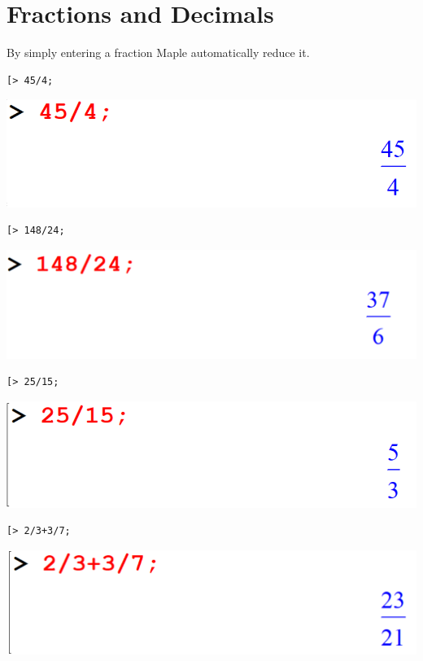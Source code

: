 \documentclass[
]{book}
\theoremstyle{definition}
\theoremstyle{definition}
\theoremstyle{definition}
\theoremstyle{definition}
\theoremstyle{remark}
\begin{document}
\section{Fractions and Decimals}\label{fractions-and-decimals}

By simply entering a fraction Maple automatically reduce it.

\begin{verbatim}
[> 45/4;
\end{verbatim}

\includegraphics{figures/Lesson 1/fig19.png}

\begin{verbatim}
[> 148/24;
\end{verbatim}

\includegraphics{figures/Lesson 1/fig20.png}

\begin{verbatim}
[> 25/15;
\end{verbatim}

\includegraphics{figures/Lesson 1/fig21.png}

\begin{verbatim}
[> 2/3+3/7;
\end{verbatim}

\includegraphics{figures/Lesson 1/fig22.png}
\end{document}
